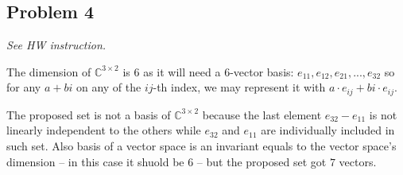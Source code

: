 \documentclass[11pt]{article}
\begin{document}
\subsection*{Problem 4}
\textit{See HW instruction.}\newline

The dimension of $\mathbb{C}^{3 \times 2}$ is $6$ as it will need a 6-vector basis: $e_{11}, e_{12}, e_{21}, ... , e_{32}$ so for any $a + bi$ on any of the $ij$-th index, we may represent it with $a \cdot e_{ij} + bi \cdot e_{ij}$.

The proposed set is not a basis of $\mathbb{C}^{3 \times 2}$ because the last element $e_{32} - e_{11}$ is not linearly independent to the others while $e_{32}$ and $e_{11}$ are individually included in such set. Also basis of a vector space is an invariant equals to the vector space's dimension -- in this case it shuold be $6$ -- but the proposed set got $7$ vectors.
\end{document}
